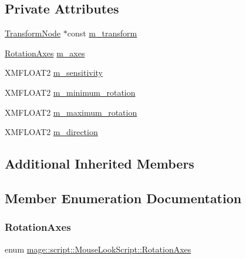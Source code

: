 \subsection*{Private Attributes}
\begin{DoxyCompactItemize}
\item 
\hyperlink{classmage_1_1_transform_node}{Transform\+Node} $\ast$const \hyperlink{classmage_1_1script_1_1_mouse_look_script_a45183059f39d6ab4a45e7b0485c9b987}{m\+\_\+transform}
\item 
\hyperlink{classmage_1_1script_1_1_mouse_look_script_aa8c8ce1a3e6ccefa7b8ddd31be209c23}{Rotation\+Axes} \hyperlink{classmage_1_1script_1_1_mouse_look_script_ae41f05d545c70cd621a405f6ef0cd4d5}{m\+\_\+axes}
\item 
X\+M\+F\+L\+O\+A\+T2 \hyperlink{classmage_1_1script_1_1_mouse_look_script_a9030a04a664c01dcec63c4e63f885302}{m\+\_\+sensitivity}
\item 
X\+M\+F\+L\+O\+A\+T2 \hyperlink{classmage_1_1script_1_1_mouse_look_script_a71deb9c2d8059680b64d679351afdfc7}{m\+\_\+minimum\+\_\+rotation}
\item 
X\+M\+F\+L\+O\+A\+T2 \hyperlink{classmage_1_1script_1_1_mouse_look_script_aadd207a51b9c8c623612e1f59ccdd65e}{m\+\_\+maximum\+\_\+rotation}
\item 
X\+M\+F\+L\+O\+A\+T2 \hyperlink{classmage_1_1script_1_1_mouse_look_script_a866577cc8df90900968c4eb83fe33b41}{m\+\_\+direction}
\end{DoxyCompactItemize}
\subsection*{Additional Inherited Members}


\subsection{Member Enumeration Documentation}
\hypertarget{classmage_1_1script_1_1_mouse_look_script_aa8c8ce1a3e6ccefa7b8ddd31be209c23}{}\label{classmage_1_1script_1_1_mouse_look_script_aa8c8ce1a3e6ccefa7b8ddd31be209c23} 
\subsubsection{\texorpdfstring{Rotation\+Axes}{RotationAxes}}
{\footnotesize\ttfamily enum \hyperlink{classmage_1_1script_1_1_mouse_look_script_aa8c8ce1a3e6ccefa7b8ddd31be209c23}{mage\+::script\+::\+Mouse\+Look\+Script\+::\+Rotation\+Axes}\hspace{0.3cm}{\ttfamily [strong]}}

